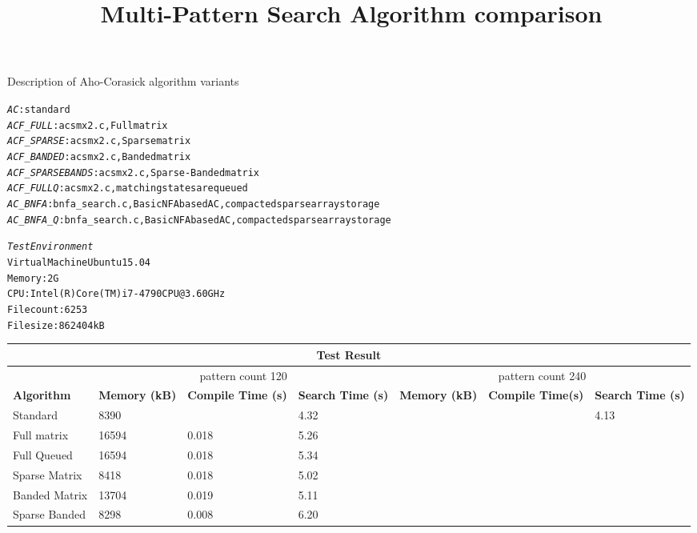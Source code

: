 \documentclass[a4paper]{article}
\begin{document}
\title{Multi-Pattern Search Algorithm comparison}
\author{}
\maketitle

Description of Aho-Corasick algorithm variants
\begin{alltt}
\emph{AC}: standard
\emph{ACF_FULL}: acsmx2.c, Full matrix
\emph{ACF_SPARSE}: acsmx2.c, Sparse matrix
\emph{ACF_BANDED}: acsmx2.c, Banded matrix
\emph{ACF_SPARSEBANDS}: acsmx2.c, Sparse-Banded matrix
\emph{ACF_FULLQ}: acsmx2.c, matching states are queued
\emph{AC_BNFA}: bnfa_search.c, Basic NFA based AC, compacted sparse array storage
\emph{AC_BNFA_Q}: bnfa_search.c, Basic NFA based AC, compacted sparse array storage
\end{alltt}

\begin{alltt}
\emph{Test Environment}
Virtual Machine Ubuntu 15.04
Memory: 2G
CPU: Intel(R) Core(TM) i7-4790 CPU @ 3.60GHz
File count: 6253
File size: 862404 kB
\end{alltt}

\begin{table}
\begin{tabular}{ |l|p{2cm}|p{2cm}|p{2cm}|p{2cm}|p{2cm}|p{2cm}| }
\multicolumn{7}{c}{\textbf{Test Result}}  \\
\hline\hline
& \multicolumn{3}{|c|}{pattern count 120}  &
  \multicolumn{3}{|c|}{pattern count 240} \\
\cline{2-7}
\textbf{Algorithm} & \textbf{Memory (kB)} & \textbf{Compile Time (s)}
  & \textbf{Search Time (s)} & \textbf{Memory (kB)} & \textbf{Compile Time(s)} & \textbf{Search Time (s)} \\
\hline\hline
Standard & 8390 &  & 4.32 & & & 4.13 \\
Full matrix & 16594 & 0.018 & 5.26  & & & \\
Full Queued & 16594 & 0.018 & 5.34 & & & \\
Sparse Matrix & 8418 & 0.018 & 5.02 & & & \\
Banded Matrix & 13704 & 0.019 & 5.11 & & & \\
Sparse Banded & 8298 & 0.008 & 6.20 & & & \\

\hline
\end{tabular}
\end{table}
\end{document}
